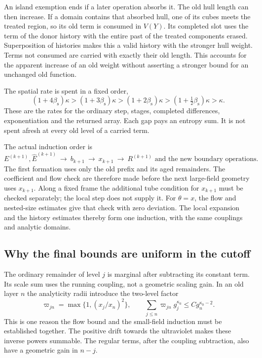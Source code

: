 \documentclass[11pt,letterpaper,reqno]{amsart}
\theoremstyle{definition}
\theoremstyle{remark}
\begin{document}
An island exemption ends if
a later operation absorbs it.
The old hull length can then
increase. If a domain contains
that absorbed hull, one of
its cubes meets the treated
region, so its old term is
consumed in $V(Y)$. Its
completed slot uses the term
of the donor history with
the entire past of the treated
components erased. Superposition
of histories makes this a
valid history with the stronger
hull weight. Terms not consumed
are carried with exactly their
old length. This accounts for
the apparent increase of an
old weight without asserting
a stronger bound for an
unchanged old function.

The spatial rate is spent in
a fixed order,
\begin{equation}\label{eq:xrg-rate-ladder}
 (1+4\beta_{\mathrm s})\kappa
 >(1+3\beta_{\mathrm s})\kappa
 >(1+2\beta_{\mathrm s})\kappa
 >(1+\tfrac12\beta_{\mathrm s})\kappa
 >\kappa.
\end{equation}
These are the rates for the
ordinary step, stages,
completed differences,
exponentiation and the
returned array. Each gap
pays an entropy sum. It is
not spent afresh at every
old level of a carried term.

The actual induction order is
\[
 E^{(k+1)},\widehat E^{(k+1)}
 \ \longrightarrow\ b_{k+1}
 \ \longrightarrow\ x_{k+1}
 \ \longrightarrow\ R^{(k+1)}
       \text{ and the new boundary operations}.
\]
The first formation uses only
the old prefix and its aged
remainders. The coefficient
and flow check are therefore
made before the next
large-field geometry uses
$x_{k+1}$. Along a fixed
frame the additional tube
condition for $x_{k+1}$ must
be checked separately; the
local step does not supply it.
For $\theta=x$, the flow
and nested-size estimates
give that check with zero
deviation.
The local expansion and the
history estimates thereby form
one induction, with the same
couplings and analytic domains.

\subsection{Why the final bounds are uniform in the cutoff}

The ordinary remainder of level $j$ is marginal after subtracting
its constant term. Its scale sum uses the running coupling, not a
geometric scaling gain. In an old layer $n$ the analyticity radii
introduce the two-level factor
\[
 \varpi_{jn}=\max\{1,(x_j/x_n)^2\},\qquad
 \sum_{j\le n}\varpi_{jn}g_j^{\kappa_0}
                  \le Cg_n^{\kappa_0-2}.
\]
This is one reason the flow bound and the small-field induction must
be established together. The positive drift towards the ultraviolet
makes these inverse powers summable. The regular terms, after the
coupling subtraction, also have a geometric gain in $n-j$.
\end{document}
